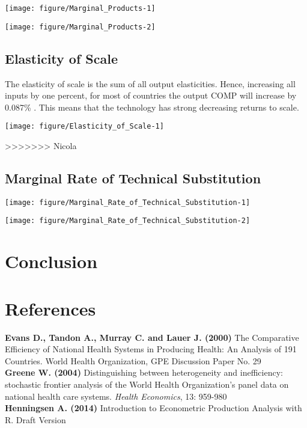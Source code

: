 \documentclass[12pt,a4paper]{article}\usepackage[]{graphicx}\usepackage[]{color}
\makeatletter
\def\maxwidth{ %
  \ifdim\Gin@nat@width>\linewidth
    \linewidth
  \else
    \Gin@nat@width
  \fi
}
\makeatother
\begin{document}
\texttt{[image: figure/Marginal\_Products-1]} 

\texttt{[image: figure/Marginal\_Products-2]} 


\subsection{Elasticity of Scale}
The elasticity of scale is the sum of all output elasticities. Hence, increasing all  inputs by one percent, for most of countries
the output COMP will increase by 0.087\% .
This means that the technology has strong decreasing returns to scale.

\texttt{[image: figure/Elasticity\_of\_Scale-1]} 

>>>>>>> Nicola
\subsection{Marginal Rate of Technical Substitution}


\texttt{[image: figure/Marginal\_Rate\_of\_Technical\_Substitution-1]} 

\texttt{[image: figure/Marginal\_Rate\_of\_Technical\_Substitution-2]} 



\section{Conclusion}



\newpage
\section{References}
\textbf{Evans D., Tandon A., Murray C. and Lauer J. (2000)} The Comparative Efficiency of National Health Systems in Producing Health: An Analysis of 191 Countries. World Health Organization, GPE Discussion Paper No. 29 \\

\textbf{Greene W. (2004)} Distinguishing between heterogeneity and inefficiency: stochastic frontier analysis of the World Health Organization's panel data on national health care systems. \textit{Health Economics}, 13: 959-980 \\

\textbf{Henningsen A. (2014)} Introduction to Econometric Production Analysis with R. Draft Version \\
\end{document}
